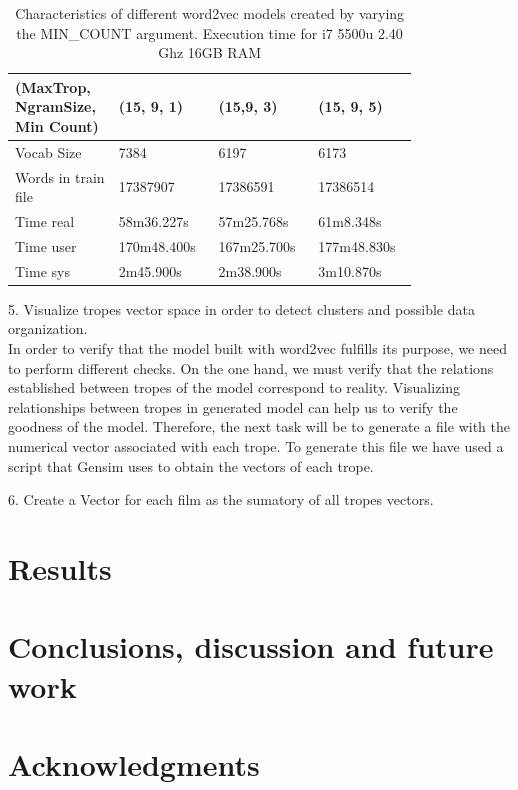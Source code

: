 \documentclass[letterpaper]{article}
\begin{document}
	   
	\begin{table}[t]
		\centering
		\begin{tabular}{|p{0.20\linewidth}|p{0.2\linewidth}|p{0.2\linewidth}|p{0.2\linewidth}|}
			\hline
			\textbf{(MaxTrop, NgramSize, Min Count)}& \textbf{(15, 9, 1)} & \textbf{(15,9, 3)} & \textbf{(15, 9, 5)}\\
			\hline
			\hline
			Vocab Size& 7384 & 6197 & 6173 \\
			\hline
			Words in train file& 17387907 & 17386591 & 17386514 \\
			\hline
			Time real&58m36.227s&57m25.768s&61m8.348s\\
			\hline
			Time user&170m48.400s&167m25.700s&177m48.830s\\
			\hline
			Time sys&2m45.900s&2m38.900s&3m10.870s\\
			\hline
			
		\end{tabular}
		\caption{Characteristics of different word2vec models created by varying the MIN\_COUNT argument. Execution time for i7 5500u 2.40 Ghz 16GB RAM}
		\label{tab:variations-with-min-count-argument-15-9}
	\end{table}	
	
	
	5. Visualize tropes vector space in order to detect clusters and possible data organization. \\
	   In order to verify that the model built with word2vec fulfills its purpose, we need to perform different checks. On the one hand, 
	   we must verify that the relations established between tropes of the model correspond to reality. 
	   Visualizing relationships between tropes in generated model can help us to verify the goodness of the model.
	   Therefore, the next task will be to generate a file with the numerical vector associated with each trope. To generate this file we have used a script that Gensim uses to obtain the vectors of each trope.
	   
	6. Create a Vector for each film as the sumatory of all tropes vectors. \\
	
	\section{Results}
	\label{sec:res}
	
	\section{Conclusions, discussion and future work}
	
	\section{Acknowledgments}
	
	
	
	
\end{document}
